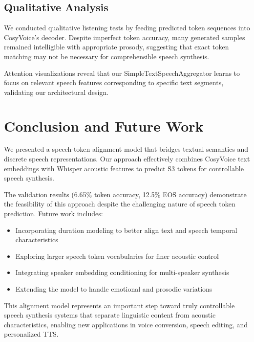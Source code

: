 \documentclass[10pt,twocolumn,letterpaper]{article}
\begin{document}
\subsection{Qualitative Analysis}

We conducted qualitative listening tests by feeding predicted token sequences into CosyVoice's decoder. Despite imperfect token accuracy, many generated samples remained intelligible with appropriate prosody, suggesting that exact token matching may not be necessary for comprehensible speech synthesis.

Attention visualizations reveal that our SimpleTextSpeechAggregator learns to focus on relevant speech features corresponding to specific text segments, validating our architectural design.

\section{Conclusion and Future Work}
\label{sec:conclusion}

We presented a speech-token alignment model that bridges textual semantics and discrete speech representations. Our approach effectively combines CosyVoice text embeddings with Whisper acoustic features to predict S3 tokens for controllable speech synthesis.

The validation results (6.65\% token accuracy, 12.5\% EOS accuracy) demonstrate the feasibility of this approach despite the challenging nature of speech token prediction. Future work includes:
\begin{itemize}
\item Incorporating duration modeling to better align text and speech temporal characteristics
\item Exploring larger speech token vocabularies for finer acoustic control
\item Integrating speaker embedding conditioning for multi-speaker synthesis
\item Extending the model to handle emotional and prosodic variations
\end{itemize}

This alignment model represents an important step toward truly controllable speech synthesis systems that separate linguistic content from acoustic characteristics, enabling new applications in voice conversion, speech editing, and personalized TTS.

{
\small


}
\end{document}
